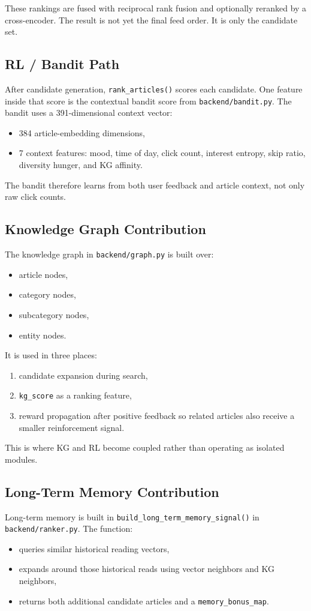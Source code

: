 \documentclass[12pt]{article}
\begin{document}
These rankings are fused with reciprocal rank fusion and optionally reranked by a cross-encoder. The result is not yet the final feed order. It is only the candidate set.

\subsection{RL / Bandit Path}
After candidate generation, \texttt{rank\_articles()} scores each candidate. One feature inside that score is the contextual bandit score from \texttt{backend/bandit.py}. The bandit uses a 391-dimensional context vector:
\begin{itemize}[leftmargin=1.5em]
  \item 384 article-embedding dimensions,
  \item 7 context features: mood, time of day, click count, interest entropy, skip ratio, diversity hunger, and KG affinity.
\end{itemize}

The bandit therefore learns from both user feedback and article context, not only raw click counts.

\subsection{Knowledge Graph Contribution}
The knowledge graph in \texttt{backend/graph.py} is built over:
\begin{itemize}[leftmargin=1.5em]
  \item article nodes,
  \item category nodes,
  \item subcategory nodes,
  \item entity nodes.
\end{itemize}

It is used in three places:
\begin{enumerate}[leftmargin=1.5em]
  \item candidate expansion during search,
  \item \texttt{kg\_score} as a ranking feature,
  \item reward propagation after positive feedback so related articles also receive a smaller reinforcement signal.
\end{enumerate}

This is where KG and RL become coupled rather than operating as isolated modules.

\subsection{Long-Term Memory Contribution}
Long-term memory is built in \texttt{build\_long\_term\_memory\_signal()} in \texttt{backend/ranker.py}. The function:
\begin{itemize}[leftmargin=1.5em]
  \item queries similar historical reading vectors,
  \item expands around those historical reads using vector neighbors and KG neighbors,
  \item returns both additional candidate articles and a \texttt{memory\_bonus\_map}.
\end{itemize}
\end{document}
